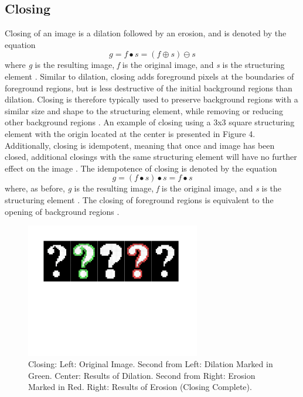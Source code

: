 \documentclass{sig-alternate}
\begin{document}
\subsection{Closing}\label{closing}
Closing of an image is a dilation followed by an erosion, and is denoted by the equation
\begin{equation*}
g = f \bullet s = (f \oplus s) \ominus s
\end{equation*}
where \textit{g} is the resulting image, \textit{f} is the original image, and \textit{s} is the structuring element \cite{MorphologyWikiAnonymous, MorphologyBook:2000}. Similar to dilation, closing adds foreground pixels at the boundaries of foreground regions, but is less destructive of the initial background regions than dilation. Closing is therefore typically used to preserve background regions with a similar size and shape to the structuring element, while removing or reducing other background regions \cite{MorphologyWiki}. An example of closing using a 3x3 square structuring element with the origin located at the center is presented in Figure 4. Additionally, closing is idempotent, meaning that once and image has been closed, additional closings with the same structuring element will have no further effect on the image \cite{MorphologyWiki, MorphologyPaper:1987}. The idempotence of closing is denoted by the equation
\begin{equation*}
g = (f \bullet s) \bullet s = f \bullet s
\end{equation*}
where, as before, \textit{g} is the resulting image, \textit{f} is the original image, and \textit{s} is the structuring element \cite{MorphologyWikiAnonymous}. The closing of foreground regions is equivalent to the opening of background regions \cite{MorphologyWiki}.
\begin{figure}
\centering
\includegraphics[width=3in,trim={0 4.75in 0 0},clip]{closing}
\caption{Closing: Left: Original Image. Second from Left: Dilation Marked in Green. Center: Results of Dilation. Second from Right: Erosion Marked in Red. Right: Results of Erosion (Closing Complete).}
\end{figure}
\end{document}

